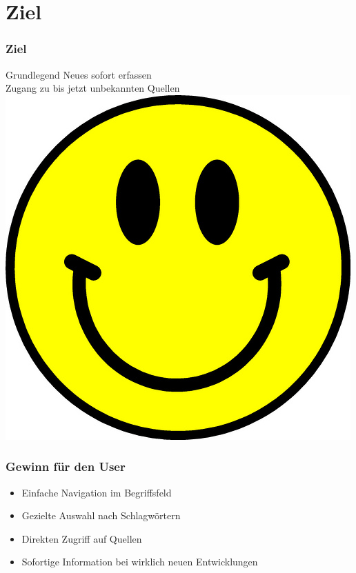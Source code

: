 \documentclass{beamer}
\begin{document}
\section{Ziel}
\begin{frame}
  \frametitle{Ziel} \pause
  \begin{center}
    Grundlegend Neues sofort erfassen \pause \\
    Zugang zu bis jetzt unbekannten Quellen \pause \\
    \includegraphics[height=.4\textheight]{happy}     
  \end{center}
\end{frame}

\begin{frame}
  \frametitle{Gewinn für den User} \pause
  \begin{itemize}
    \item Einfache Navigation im Begriffsfeld \pause
    \item Gezielte Auswahl nach Schlagwörtern \pause
    \item Direkten Zugriff auf Quellen \pause
    \item Sofortige Information bei wirklich neuen Entwicklungen
  \end{itemize}
\end{frame}
\end{document}
